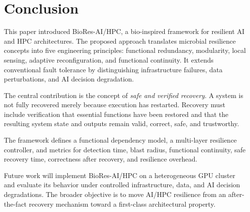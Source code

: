 \documentclass[conference]{IEEEtran}
\begin{document}
\section{Conclusion}

This paper introduced BioRes-AI/HPC, a bio-inspired framework for resilient AI and HPC architectures. The proposed approach translates microbial resilience concepts into five engineering principles: functional redundancy, modularity, local sensing, adaptive reconfiguration, and functional continuity. It extends conventional fault tolerance by distinguishing infrastructure failures, data perturbations, and AI decision degradation.

The central contribution is the concept of \emph{safe and verified recovery}. A system is not fully recovered merely because execution has restarted. Recovery must include verification that essential functions have been restored and that the resulting system state and outputs remain valid, correct, safe, and trustworthy.

The framework defines a functional dependency model, a multi-layer resilience controller, and metrics for detection time, blast radius, functional continuity, safe recovery time, correctness after recovery, and resilience overhead.

Future work will implement BioRes-AI/HPC on a heterogeneous GPU cluster and evaluate its behavior under controlled infrastructure, data, and AI decision degradations. The broader objective is to move AI/HPC resilience from an after-the-fact recovery mechanism toward a first-class architectural property.
\end{document}
